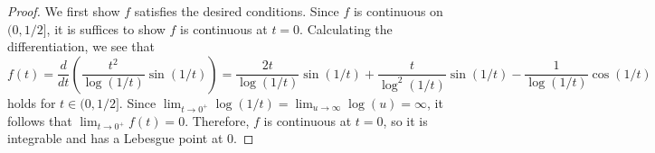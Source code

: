 \documentclass{article}
\theoremstyle{definition}
\newcommand{\pr}[1]{ \left( #1 \right) }
\begin{document}
\begin{proof}
    We first show $f$ satisfies the desired conditions. 
    Since $f$ is continuous on $(0,1/2]$, it is suffices to show $f$ is continuous at $t=0$. 
    Calculating the differentiation, we see that
    \begin{equation*}
        f(t)= 
        \frac{d}{dt}  \pr{ \frac{t^2}{\log(1/t)} \sin(1/t) }
        = \frac{2t}{\log(1/t)} \sin(1/t)
        + \frac{t}{\log^2(1/t)} \sin(1/t)
        - \frac{1}{\log(1/t)} \cos(1/t) 
    \end{equation*}
    holds for $t\in(0,1/2]$. 
    Since $\lim_{t\to0^+} \log(1/t) = \lim_{u\to\infty} \log(u) = \infty$, it follows that $\lim_{t\to0^+} f(t) = 0$. 
    Therefore, $f$ is continuous at $t=0$, so it is integrable and has a Lebesgue point at $0$. 


\end{proof}
\end{document}
